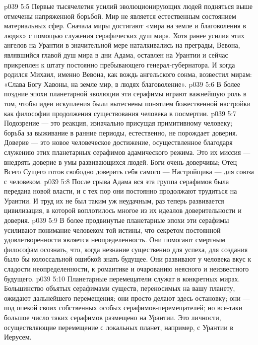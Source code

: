 \vs p039 5:5 \pc {}\bibnobreakspace {} Первые тысячелетия усилий эволюционирующих людей подняться выше отмечены напряженной борьбой. Мир не является естественным состоянием материальных сфер. Сначала миры достигают «мира на земле и благоволения в людях» с помощью служения серафических душ мира. Хотя ранее усилия этих ангелов на Урантии в значительной мере наталкивались на преграды, Вевона, являвшийся главой душ мира в дни Адама, оставлен на Урантии и сейчас прикреплен к штату постоянно пребывающего генерал\hyp{}губернатора. И когда родился Михаил, именно Вевона, как вождь ангельского сонма, возвестил мирам: «Слава Богу Хавоны, на земле мир, в людях благоволение».
\vs p039 5:6 В более поздние эпохи планетарной эволюции эти серафимы играют важнейшую роль в том, чтобы идеи искупления были вытеснены понятием божественной настройки как философии продолжения существования человека в посмертии.
\vs p039 5:7 \pc {}\bibnobreakspace {} Подозрение --- это реакция, изначально присущая примитивному человеку; борьба за выживание в ранние периоды, естественно, не порождает доверия. Доверие --- это новое человеческое достижение, осуществленное благодаря служению этих планетарных серафимов адамического режима. Это их миссия --- внедрять доверие в умы развивающихся людей. Боги очень доверчивы; Отец Всего Сущего готов свободно доверить себя самого --- Настройщика --- для союза с человеком.
\vs p039 5:8 После срыва Адама вся эта группа серафимов была передана новой власти, и с тех пор они постоянно продолжают трудиться на Урантии. И труд их не был таким уж неудачным, раз теперь развивается цивилизация, в которой воплотилось многое из их идеалов доверительности и доверия.
\vs p039 5:9 В более продвинутые планетарные эпохи эти серафимы усиливают понимание человеком той истины, что секретом постоянной удовлетворенности является неопределенность. Они помогают смертным философам осознать, что, когда незнание существенно для успеха, для создания было бы колоссальной ошибкой знать будущее. Они развивают у человека вкус к сладости неопределенности, к романтике и очарованию неясного и неизвестного будущего.
\vs p039 5:10 \pc {}\bibnobreakspace {} Планетарные перемещатели служат в конкретных мирах. Большинство объятых серафимами существ, переносимых на вашу планету, ожидают дальнейшего перемещения; они просто делают здесь остановку; они --- под опекой своих собственных особых серафимов\hyp{}перемещателей; но все\hyp{}таки большое число таких серафимов размещено на Урантии. Это личности, осуществляющие перемещение с локальных планет, например, с Урантии в Иерусем.
